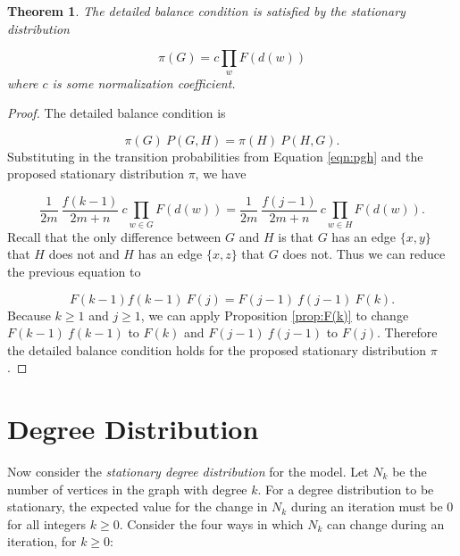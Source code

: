 \documentclass[a4paper,10pt]{article}
\newtheorem{theorem}{Theorem}
\begin{document}
\begin{theorem}
 The detailed balance condition is satisfied by the stationary distribution

\begin{equation}
 \pi(G) = c \prod_{w} F(d(w))
\end{equation}
where $c$ is some normalization coefficient.
\end{theorem}
\begin{proof}
The detailed balance condition is

\begin{equation}
 \pi(G) \: P(G, H) = \pi(H) \: P(H, G).
\end{equation}
Substituting in the transition probabilities from Equation \ref{eqn:pgh} and the proposed stationary distribution $\pi$, we have

\begin{equation}
\frac{1}{2m} \: \frac{f(k-1)}{2m+n}\:c\prod_{w \in G} F(d(w))  = \frac{1}{2m} \: \frac{f(j-1)}{2m+n}\:c\prod_{w \in H} F(d(w)).
\end{equation}
Recall that the only difference between $G$ and $H$ is that $G$ has an edge $\{x, y\}$ that $H$ does not and $H$ has an edge $\{x, z\}$ that $G$ does not. Thus we can reduce the previous equation to

\begin{equation}
F(k - 1) f(k - 1)\: F(j) = F(j - 1) \: f(j - 1) \: F(k).
\end{equation}
Because $k \geq 1$ and $j \geq 1$, we can apply Proposition \ref{prop:F(k)} to change $F(k - 1) \: f(k - 1)$ to $F(k)$ and $F(j - 1) \: f(j - 1)$ to $F(j)$. Therefore the detailed balance condition holds for the proposed stationary distribution $\pi$. 
\end{proof}

\section{Degree Distribution}
Now consider the \emph{stationary degree distribution} for the model. Let $N_k$ be the number of vertices in the graph with degree $k$. For a degree distribution to be stationary, the expected value for the change in $N_k$ during an iteration must be 0 for all integers $k \geq 0$. Consider the four ways in which $N_k$ can change during an iteration, for $k \geq 0$:
\end{document}
